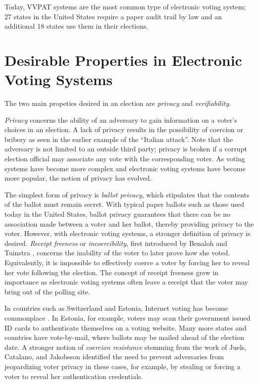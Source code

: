 Today, VVPAT systems are the most common type of electronic voting system; 27 states in the United States require a paper audit trail by law and an additional 18 states use them in their elections.

\section{Desirable Properties in Electronic Voting Systems} \label{intro:props}

The two main propeties desired in an election are \emph{privacy} and \emph{verifiability}.

\emph{Privacy} concerns the ability of an adversary to gain information on a voter's choices in an election. A lack of privacy results in the possibility of coercion or bribery as seen in the earlier example of the ``Italian attack''. Note that the adversary is not limited to an outside third party; privacy is broken if a corrupt election official may associate any vote with the corresponding voter. As voting systems have become more complex and electronic voting systems have become more popular, the notion of privacy has evolved.

The simplest form of privacy is \emph{ballot privacy}, which stipulates that the contents of the ballot must remain secret. With typical paper ballots such as those used today in the United States, ballot privacy guarantees that there can be no association made between a voter and her ballot, thereby providing privacy to the voter. However, with electronic voting systems, a stronger definition of privacy is desired. \emph{Receipt freeness} or \emph{incoercibility}, first introduced by Benaloh and Tuinstra \cite{bt94}, concerns the inability of the voter to later prove how she voted. Equivalently, it is impossible to effectively coerce a voter by forcing her to reveal her vote following the election. The concept of receipt freeness grew in importance as electronic voting systems often leave a receipt that the voter may bring out of the polling site.

In countries such as Switzerland and Estonia, Internet voting has become commonplace \cite{wiki:evote}. In Estonia, for example, voters may scan their government issued ID cards to authenticate themselves on a voting website. Many more states and countries have vote-by-mail, where ballots may be mailed ahead of the election date. A stronger notion of \emph{coercion resistance} stemming from the work of Juels, Catalano, and Jakobsson \cite{jcj05} identified the need to prevent adversaries from jeopardizing voter privacy in these cases, for example, by stealing or forcing a voter to reveal her authentication credentials.

